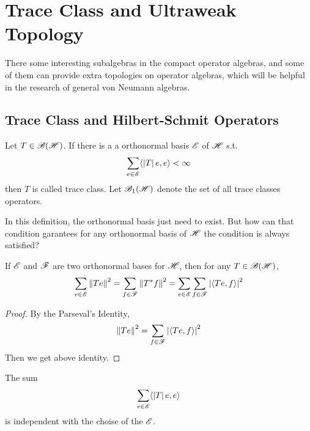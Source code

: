 \documentclass[a4paper,11pt]{report}
\begin{document}
\section{Trace Class and Ultraweak Topology}

There some interesting subalgebras in the compact operator algebras, and some of them can provide extra topologies on operator algebras, which will be helpful in the research of general von Neumann algebras.

\subsection{Trace Class and Hilbert-Schmit Operators}

\begin{defn}
	Let $T \in \mathscr{B(H)}$. If there is a a orthonormal basis $\mathscr{E}$ of $\mathscr{H}$ s.t.
	\begin{equation*}
		\sum_{e \in \mathscr{E}} \langle \left\lvert T\right\lvert e,e \rangle < \infty
	\end{equation*}
	then $T$ is called trace class. Let $\mathscr{B}_{1}\mathscr{(H)}$ denote the set of all trace classes operators.
\end{defn}

In this definition, the orthonormal basis just need to exist. But how can that condition garantees for any orthonormal basis of $\mathscr{H}$ the condition is always satisfied?

\begin{prop}
	If $\mathscr{E}$ and $\mathscr{F}$ are two orthonormal bases for $\mathscr{H}$, then for any $T \in \mathscr{B(H)}$,
	\begin{equation*}
		\sum_{e \in \mathscr{E}} \left\lVert Te\right\lVert^2 = \sum_{f \in \mathscr{F}} \left\lVert T^{*}f\right\lVert^2 = \sum_{e \in \mathscr{E}}\sum_{f \in \mathscr{F}} \left\lvert\langle Te,f \rangle\right\lvert^2
	\end{equation*}
\end{prop}
\begin{proof}
	By the Parseval's Identity,
	\begin{equation*}
		\left\lVert Te\right\lVert^2 = \sum_{f \in \mathscr{F}} \left\lvert\langle Te,f \rangle\right\lvert^2
	\end{equation*}
	Then we get above identity.
\end{proof}

\begin{cor}
	The sum 
	\begin{equation*}
		\sum_{e \in \mathscr{E}} \langle \left\lvert T\right\lvert e,e \rangle
	\end{equation*}
	is independent with the choise of the $\mathscr{E}$.
\end{cor}
\end{document}

